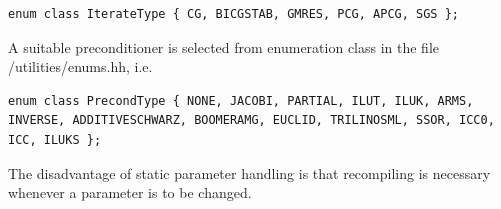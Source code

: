 \documentclass[11pt]{article}
\begin{document}
\begin{itemize}
\begin{lstlisting}
enum class IterateType { CG, BICGSTAB, GMRES, PCG, APCG, SGS };
\end{lstlisting}

A suitable preconditioner is selected from enumeration class in the file /utilities/enums.hh, i.e.

\begin{lstlisting}
enum class PrecondType { NONE, JACOBI, PARTIAL, ILUT, ILUK, ARMS, INVERSE, ADDITIVESCHWARZ, BOOMERAMG, EUCLID, TRILINOSML, SSOR, ICC0, ICC, ILUKS };
\end{lstlisting}

\end{itemize}

The disadvantage of static parameter handling is that recompiling is necessary whenever
a parameter is to be changed.
\end{document}
